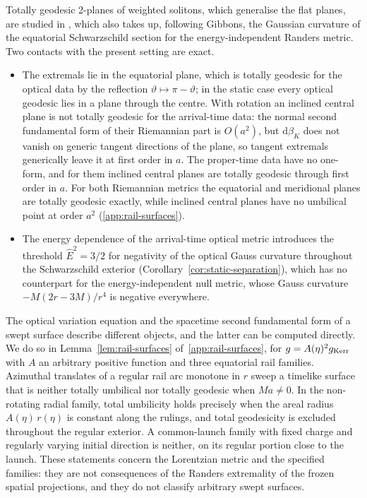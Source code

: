 \documentclass[12pt]{iopart}
\theoremstyle{plain}
\theoremstyle{definition}
\theoremstyle{remark}
\newcommand{\Ehat}{\hat E}
\newcommand{\dd}{\mathrm{d}}
\begin{document}
Totally geodesic 2-planes of weighted solitons, which generalise the flat planes, are
studied in \cite{Lecian2026TwoPlanes}, which also takes up, following Gibbons, the
Gaussian curvature of the equatorial Schwarzschild section for the energy-independent
Randers metric. Two contacts with the present setting are exact.
\begin{itemize}
\item The extremals lie in the equatorial plane, which is totally geodesic for the optical
data by the reflection $\vartheta\mapsto\pi-\vartheta$; in the static case every optical
geodesic lies in a plane through the centre. With rotation an inclined central plane is
not totally geodesic for the arrival-time data: the normal second fundamental form of their
Riemannian part is $O(a^2)$, but $\dd\beta_K$ does not vanish on generic tangent directions
of the plane, so tangent extremals generically leave it at first order in $a$. The
proper-time data have no one-form, and for them inclined central planes are totally
geodesic through first order in $a$. For both Riemannian metrics the equatorial and
meridional planes are totally geodesic exactly, while inclined central planes have no
umbilical point at order $a^2$ (\ref{app:rail-surfaces}).
\item The energy dependence of the arrival-time optical metric introduces the threshold
$\Ehat^2=3/2$ for negativity of the optical Gauss curvature throughout the Schwarzschild
exterior (Corollary~\ref{cor:static-separation}), which has no counterpart for the
energy-independent null metric, whose Gauss curvature $-M(2r-3M)/r^4$ is negative
everywhere.
\end{itemize}
The optical variation equation and the spacetime second fundamental form of a swept
surface describe different objects, and the latter can be computed directly. We do so in
Lemma~\ref{lem:rail-surfaces} of~\ref{app:rail-surfaces}, for $g=A(\eta)^2g_{\rm Kerr}$
with $A$ an arbitrary positive function and three equatorial rail families. Azimuthal
translates of a regular rail arc monotone in $r$ sweep a timelike surface that is neither
totally umbilical nor totally geodesic when $Ma\neq0$. In the non-rotating radial family,
total umbilicity holds precisely when the areal radius $A(\eta)\,r(\eta)$ is constant
along the rulings, and total geodesicity is excluded throughout the regular exterior. A
common-launch family with fixed charge and regularly varying initial direction is
neither, on its regular portion close to the launch. These statements concern the
Lorentzian metric and the specified families: they are not consequences of the Randers
extremality of the frozen spatial projections, and they do not classify arbitrary swept
surfaces.
\end{document}
